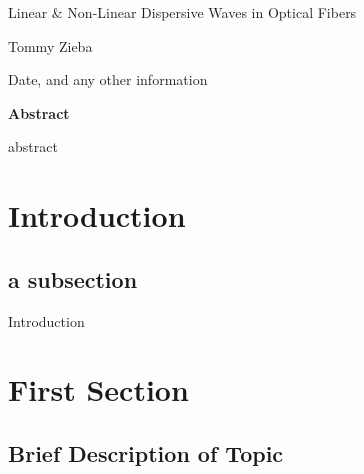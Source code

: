 \documentclass[12pt]{article}
\theoremstyle{definition}
\numberwithin{equation}{section}
\begin{document}
\begin{titlepage}

\large

\begin{center}
{\LARGE Linear \& Non-Linear Dispersive Waves in Optical Fibers}

\vspace{20mm}

{\Large Tommy Zieba}

\vspace{20mm}

{\large Date, and any other information}
\end{center}



\end{titlepage}



\pagebreak
{}

\tableofcontents
{}

\newpage


\begin{center}

{\Large \bf Abstract}
\end{center}

abstract

\pagebreak

\section{Introduction}

\subsection{a subsection}


Introduction

\section{First Section}
\subsection{Brief Description of Topic}
\end{document}
